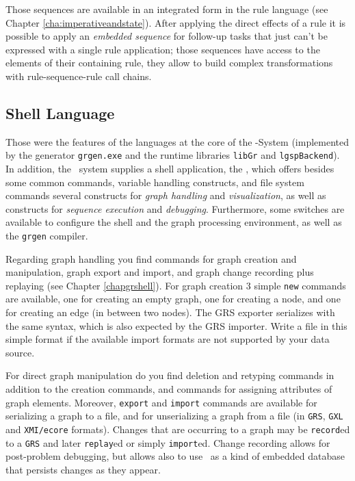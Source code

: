 Those sequences are available in an integrated form in the rule language (see Chapter \ref{cha:imperativeandstate}).
After applying the direct effects of a rule it is possible to apply an \emph{embedded sequence} for follow-up tasks that just can't be expressed with a single rule application; those sequences have access to the elements of their containing rule, they allow to build complex transformations with rule-sequence-rule call chains.
		
\subsection{Shell Language}
Those were the features of the languages at the core of the \GrG-System (implemented by the generator \texttt{grgen.exe} and the runtime libraries \texttt{libGr} and \texttt{lgspBackend}).
In addition, the \GrG\ system supplies a shell application, the \GrShell,
which offers besides some common commands, variable handling constructs, and file system commands several constructs for \emph{graph handling} and \emph{visualization}, as well as constructs for \emph{sequence execution} and \emph{debugging}.
Furthermore, some switches are available to configure the shell and the graph processing environment, as well as the \texttt{grgen} compiler.

Regarding graph handling you find commands for graph creation and manipulation, graph export and import, and graph change recording plus replaying (see Chapter \ref{chapgrshell}).
For graph creation 3 simple \texttt{new} commands are available, one for creating an empty graph, one for creating a node, and one for creating an edge (in between two nodes).
The GRS exporter serializes with the same syntax, which is also expected by the GRS importer.
Write a file in this simple format if the available import formats are not supported by your data source.

For direct graph manipulation do you find deletion and retyping commands in addition to the creation commands, and commands for assigning attributes of graph elements.
Moreover, \texttt{export} and \texttt{import} commands are available for serializing a graph to a file, and for unserializing a graph from a file (in \texttt{GRS}, \texttt{GXL} and \texttt{XMI/ecore} formats). 
Changes that are occurring to a graph may be \texttt{record}ed to a \texttt{GRS} and later \texttt{replay}ed or simply \texttt{import}ed.
Change recording allows for post-problem debugging, but allows also to use \GrG\ as a kind of embedded database that persists changes as they appear. %

